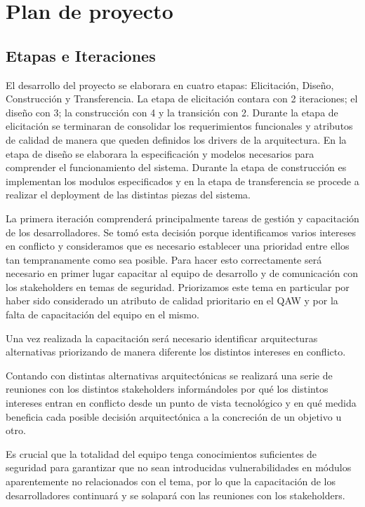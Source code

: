\section{Plan de proyecto}

\subsection{Etapas e Iteraciones}

El desarrollo del proyecto se elaborara en cuatro etapas: Elicitación, Diseño, Construcción y Transferencia. La etapa de elicitación contara con 2 iteraciones; el diseño con 3; la construcción con 4 y la transición con 2. Durante la etapa de elicitación se terminaran de consolidar los requerimientos funcionales y atributos de calidad de manera que queden definidos los drivers de la arquitectura. En la etapa de diseño se elaborara la especificación y modelos necesarios para comprender el funcionamiento del sistema. Durante la etapa de construcción es implementan los modulos especificados y en la etapa de transferencia se procede a realizar el deployment de las distintas piezas del sistema. 

La primera iteración comprenderá principalmente tareas de gestión y capacitación de los desarrolladores. Se tomó esta decisión porque identificamos varios intereses en conflicto y consideramos que es necesario establecer una prioridad entre ellos tan tempranamente como sea posible. Para hacer esto correctamente será necesario en primer lugar capacitar al equipo de desarrollo y de comunicación con los stakeholders en temas de seguridad. Priorizamos este tema en particular por haber sido considerado un atributo de calidad prioritario en el QAW y por la falta de capacitación del equipo en el mismo. 

Una vez realizada la capacitación será necesario identificar arquitecturas alternativas priorizando de manera diferente los distintos intereses en conflicto.

Contando con distintas alternativas arquitectónicas se realizará una serie de reuniones con los distintos stakeholders informándoles por qué los distintos intereses entran en conflicto desde un punto de vista tecnológico y en qué medida beneficia cada posible decisión arquitectónica a la concreción de un objetivo u otro.

Es crucial que la totalidad del equipo tenga conocimientos suficientes de seguridad para garantizar que no sean introducidas vulnerabilidades en módulos aparentemente no relacionados con el tema, por lo que la capacitación de los desarrolladores continuará y se solapará con las reuniones con los stakeholders. 

